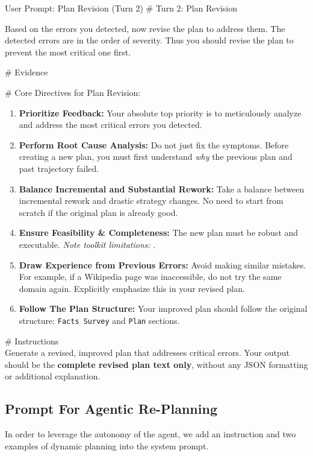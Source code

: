 \begin{UserPromptBox}{User Prompt: Plan Revision (Turn 2)}
\# Turn 2: Plan Revision

Based on the errors you detected, now revise the plan to address them. The detected errors are in the order of severity. Thus you should revise the plan to prevent the most critical one first. 

\smallskip
\# Evidence\\

\smallskip
\# Core Directives for Plan Revision:
\begin{enumerate}[leftmargin=*, label=\textbf{\arabic*.}, itemsep=2pt, parsep=0pt]
    \item \textbf{Prioritize Feedback:} Your absolute top priority is to meticulously analyze and address the most critical errors you detected.
    \item \textbf{Perform Root Cause Analysis:} Do not just fix the symptoms. Before creating a new plan, you must first understand \textit{why} the previous plan and past trajectory failed.
    \item \textbf{Balance Incremental and Substantial Rework:} Take a balance between incremental rework and drastic strategy changes. No need to start from scratch if the original plan is already good.
    \item \textbf{Ensure Feasibility \& Completeness:} The new plan must be robust and executable. \textit{Note toolkit limitations:} .
    \item \textbf{Draw Experience from Previous Errors:} Avoid making similar mistakes. For example, if a Wikipedia page was inaccessible, do not try the same domain again. Explicitly emphasize this in your revised plan.
    \item \textbf{Follow The Plan Structure:} Your improved plan should follow the original structure: \texttt{Facts Survey} and \texttt{Plan} sections.
\end{enumerate}

\smallskip
\# Instructions\\
Generate a revised, improved plan that addresses critical errors. Your output should be the \textbf{complete revised plan text only}, without any JSON formatting or additional explanation.
\end{UserPromptBox}





\subsection{Prompt For Agentic Re-Planning}
In order to leverage the autonomy of the agent, we add an instruction and two examples of dynamic planning into the system prompt.

